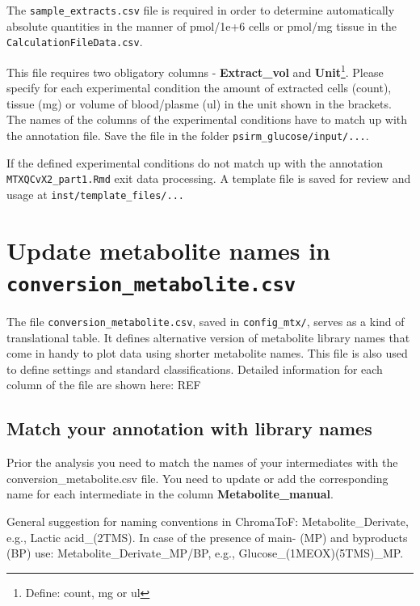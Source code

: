 \documentclass[]{book}
\let\rmarkdownfootnote\footnote%
\def\footnote{\protect\rmarkdownfootnote}
\begin{document}
The \texttt{sample\_extracts.csv} file is required in order to determine
automatically absolute quantities in the manner of pmol/1e+6 cells or
pmol/mg tissue in the \texttt{CalculationFileData.csv}.

This file requires two obligatory columns - \textbf{Extract\_vol} and
\textbf{Unit}\footnote{Define: count, mg or ul}. Please specify for each
experimental condition the amount of extracted cells (count), tissue
(mg) or volume of blood/plasme (ul) in the unit shown in the brackets.\\
The names of the columns of the experimental conditions have to match up
with the annotation file. Save the file in the folder
\texttt{psirm\_glucose/input/...}.

If the defined experimental conditions do not match up with the
annotation \texttt{MTXQCvX2\_part1.Rmd} exit data processing. A template
file is saved for review and usage at \texttt{inst/template\_files/...}

\section{\texorpdfstring{Update metabolite names in
\texttt{conversion\_metabolite.csv}}{Update metabolite names in conversion\_metabolite.csv}}\label{update-metabolite-names-in-conversion_metabolite.csv}

The file \texttt{conversion\_metabolite.csv}, saved in
\texttt{config\_mtx/}, serves as a kind of translational table. It
defines alternative version of metabolite library names that come in
handy to plot data using shorter metabolite names. This file is also
used to define settings and standard classifications. Detailed
information for each column of the file are shown here: REF

\subsection{Match your annotation with library
names}\label{match-your-annotation-with-library-names}

Prior the analysis you need to match the names of your intermediates
with the conversion\_metabolite.csv file. You need to update or add the
corresponding name for each intermediate in the column
\textbf{Metabolite\_manual}.

General suggestion for naming conventions in ChromaToF:
Metabolite\_Derivate, e.g., Lactic acid\_(2TMS). In case of the presence
of main- (MP) and byproducts (BP) use: Metabolite\_Derivate\_MP/BP,
e.g., Glucose\_(1MEOX)(5TMS)\_MP.
\end{document}
